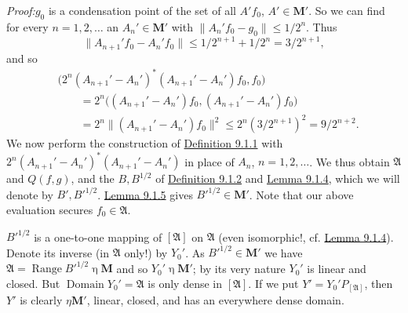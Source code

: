 \documentclass[12pt,b5paper,twoside]{article}
\newcommand{\M}{\mathbf M}
\newcommand{\Proof}{\par\noindent\textit{Proof:}\enspace}
\newcommand{\defref}[1]{\hyperref[def:#1]{Definition #1}}
\newcommand{\lemref}[1]{\hyperref[lem:#1]{Lemma #1}}
\begin{document}
\Proof $g_0$ is a condensation point of the set of all $A'f_0$,
$A'\in\M'$. So we can find for every $n=1,2,\ldots$ an $A_n'\in\M'$ with
$\lVert A_n'f_0-g_0\rVert\leq 1/2^n$. Thus
\[
 \lVert A_{n+1}'f_0-A_n'f_0\rVert
 \leq 1/2^{n+1}+1/2^n=3/2^{n+1},
\]
and so
\[
\begin{aligned}
 &\bigl(2^n(A_{n+1}'-A_n')^*(A_{n+1}'-A_n')f_0,f_0\bigr)\\
 &\qquad=2^n\bigl((A_{n+1}'-A_n')f_0,
                  (A_{n+1}'-A_n')f_0\bigr)\\
 &\qquad=2^n\lVert(A_{n+1}'-A_n')f_0\rVert^2
 \leq 2^n(3/2^{n+1})^2=9/2^{n+2}.
\end{aligned}
\]
We now perform the construction of \defref{9.1.1} with
$2^n(A_{n+1}'-A_n')^*(A_{n+1}'-A_n')$ in place of $A_n$,
$n=1,2,\ldots$. We thus obtain $\mathfrak A$ and $Q(f,g)$, and the
$B,B^{1/2}$ of \defref{9.1.2} and \lemref{9.1.4}, which we will denote by
$B',B'^{1/2}$. \lemref{9.1.5} gives $B'^{1/2}\in\M'$. Note that our
above evaluation secures $f_0\in\mathfrak A$.

$B'^{1/2}$ is a one-to-one mapping of $[\mathfrak A]$ on $\mathfrak A$
(even isomorphic!, cf. \lemref{9.1.4}). Denote its inverse (in
$\mathfrak A$ only!) by $Y_0'$. As $B'^{1/2}\in\M'$ we have
$\mathfrak A=\operatorname{Range}B'^{1/2}\mathbin\eta\M$ and so
$Y_0'\mathbin\eta\M'$; by its very nature $Y_0'$ is linear and closed. But
$\operatorname{Domain}Y_0'=\mathfrak A$ is only dense in $[\mathfrak A]$.
If we put $Y'=Y_0'P_{[\mathfrak A]}$, then $Y'$ is clearly
$\mathbin\eta\M'$, linear, closed, and has an everywhere dense domain.
\end{document}
